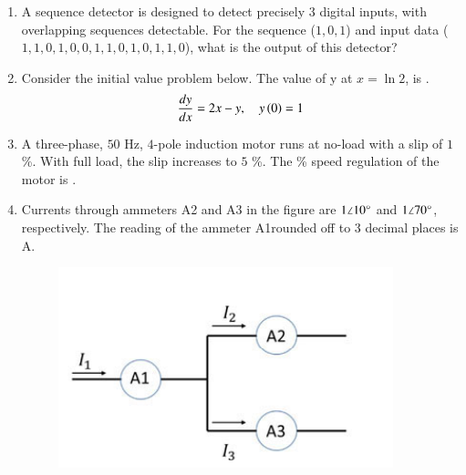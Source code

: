 \documentclass[journal,12pt,onecolumn]{IEEEtran}
\theoremstyle{remark}
\begin{document}
\begin{enumerate}[start=1, label=Q.\arabic*]
\hfill{}

\item A sequence detector is designed to detect precisely $3$ digital inputs, with overlapping sequences detectable. For the sequence ($1,0,1$) and input data ($1,1,0,1,0,0,1,1,0,1,0,1,1,0$), what is the output of this detector?
    \begin{enumerate}
    \end{enumerate}

\hfill{}

\item Consider the initial value problem below. The value of y at $x = \ln 2$,  is \underline{\hspace{2cm}}.
\begin{align*}
\frac{dy}{dx} = 2x - y, \quad y\left(0\right) = 1
\end{align*}

\hfill{}

\item A three-phase, $50$ Hz, $4$-pole induction motor runs at no-load with a slip of $1$ \%. With full load, the slip increases to $5$ \%. The \% speed regulation of the motor  is \underline{\hspace{2cm}}.

\hfill{}

\item Currents through ammeters A2 and A3 in the figure are $1\angle10\degree$ and $1\angle70\degree$, respectively. The reading of the ammeter A1rounded off to 3 decimal places is \underline{\hspace{2cm}} A.
\begin{figure}[H]
    \centering
    \includegraphics[width=0.4\columnwidth]{Figures/b28.png}
    \caption{}
\end{figure}


\end{enumerate}
\end{document}

